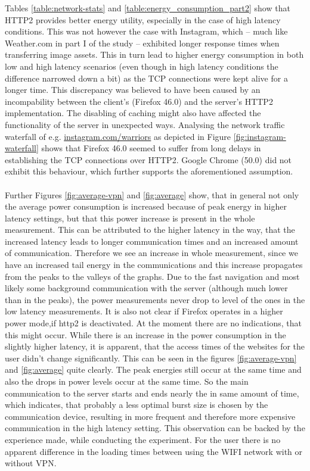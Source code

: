 \documentclass{article}
\begin{document}
Tables \ref{table:network-stats} and \ref{table:energy_consumption_part2} show that HTTP2 provides better energy utility, especially in the case of high latency conditions. This was not however the case with Instagram, which -- much like Weather.com in part I of the study -- exhibited longer response times when transferring image assets. This in turn lead to higher energy consumption in both low and high latency scenarios (even though in high latency conditions the difference narrowed down a bit) as the TCP connections were kept alive for a longer time. This discrepancy was believed to have been caused by an incompability between the client's (Firefox 46.0) and the server's HTTP2 implementation. The disabling of caching might also have affected the functionality of the server in unexpected ways. Analysing the network traffic waterfall of e.g. \url{instagram.com/warriors} as depicted in Figure \ref{fig:instagram-waterfall} shows that Firefox 46.0 seemed to suffer from long delays in establishing the TCP connections over HTTP2. Google Chrome (50.0) did not exhibit this behaviour, which further supports the aforementioned assumption.
\\\\
Further Figures \ref{fig:average-vpn} and \ref{fig:average} show, that in general not only the average power consumption is increased because of peak energy in higher latency settings, but that this power increase is present in the whole measurement. This can be attributed to the higher latency in the way, that the increased latency leads to longer communication times and an increased amount of communication. Therefore we see an increase in whole measurement, since we have an increased tail energy in the communications and this increase propagates from the peaks to the valleys of the graphs. Due to the fast navigation and most likely some background communication with the server (although much lower than in the peaks), the power measurements never drop to level of the ones in the low latency measurements. It is also not clear if Firefox operates in a higher power mode,if http2 is deactivated. At the moment there are no indications, that this might occur.
While there is an increase in the power consumption in the slightly higher latency, it is apparent, that the access times of the websites for the user didn't change significantly. This can be seen in the figures \ref{fig:average-vpn} and \ref{fig:average} quite clearly. The peak energies still occur at the same time and also the drops in power levels occur at the same time. So the main communication to the server starts and ends nearly the in same amount of time, which indicates, that probably a less optimal burst size is chosen by the communication device, resulting in more frequent and therefore more expensive communication in the high latency setting. This observation can be backed by the experience made, while conducting the experiment. For the user there is no apparent difference in the loading times between using the WIFI network with or without VPN.\\
\end{document}

